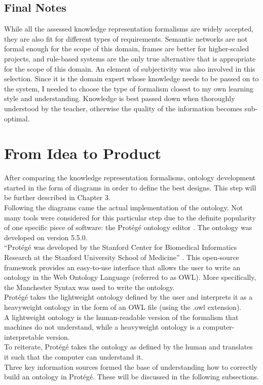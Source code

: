 \documentclass[12pt]{report}
\begin{document}
    \subsection{Final Notes}
    While all the assessed knowledge representation formalisms are widely accepted, they are also fit for different types of requirements. Semantic networks are not formal enough for the scope of this domain, frames are better for higher-scaled projects, and rule-based systems are the only true alternative that is appropriate for the scope of this domain.
    \newline
    An element of subjectivity was also involved in this selection. Since it is the domain expert whose knowledge needs to be passed on to the system, I needed to choose the type of formalism closest to my own learning style and understanding. Knowledge is best passed down when thoroughly understood by the teacher, otherwise the quality of the information becomes sub-optimal.
    
	\section{From Idea to Product}
	After comparing the knowledge representation formalisms, ontology development started in the form of diagrams in order to define the best designs. This step will be further described in Chapter 3.\\
	Following the diagrams came the actual implementation of the ontology. Not many tools were considered for this particular step due to the definite popularity of one specific piece of software: the Protégé ontology editor \cite{protege}. The ontology was developed on version 5.5.0.\\
	``Protégé was developed by the Stanford Center for Biomedical Informatics Research at the Stanford University School of Medicine'' \cite{protegerigin}. This open-source framework provides an easy-to-use interface that allows the user to write an ontology in the Web Ontology Language (referred to as OWL). More specifically, the Manchester Syntax \cite{manchestersyntax} was used to write the ontology.\\
	Protégé takes the lightweight ontology defined by the user and interprets it as a heavyweight ontology in the form of an OWL file (using the .owl extension).\\
	A lightweight ontology is the human-readable version of the formalism that machines do not understand, while a heavyweight ontology is a computer-interpretable version.\\
	To reiterate, Protégé takes the ontology as defined by the human and translates it such that the computer can understand it.\\
	Three key information sources formed the base of understanding how to correctly build an ontology in Protégé. These will be discussed in the following subsections.
	
\end{document}
